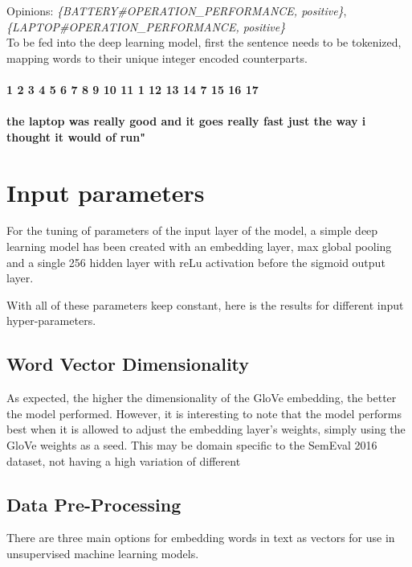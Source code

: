     Opinions: \textit{\{BATTERY\#OPERATION\_PERFORMANCE, positive\}}, \\
    
    \textit{\{LAPTOP\#OPERATION\_PERFORMANCE, positive\}}\\



To be fed into the deep learning model, first the sentence needs to be tokenized, mapping words to their unique integer encoded counterparts. 
\paragraph{1 2 3 4 5 6 7 8 9 10 11 1 12 13 14 7 15 16 17}





\paragraph{the laptop was really good and it goes really fast just the way i thought it would of run"}





\section{Input parameters}
For the tuning of parameters of the input layer of the model, a simple deep learning model has been created with an embedding layer, max global pooling and a single 256 hidden layer with reLu activation before the sigmoid output layer. 

With all of these parameters keep constant, here is the results for different input hyper-parameters. 


\subsection{Word Vector Dimensionality}

As expected, the higher the dimensionality of the GloVe embedding, the better the model performed. However, it is interesting to note that the model performs best when it is allowed to adjust the embedding layer's weights, simply using the GloVe weights as a seed. This may be domain specific to the SemEval 2016 dataset, not having a high variation of different 








\subsection{Data Pre-Processing}
There are three main options for embedding words in text as vectors for use in unsupervised machine learning models. 
